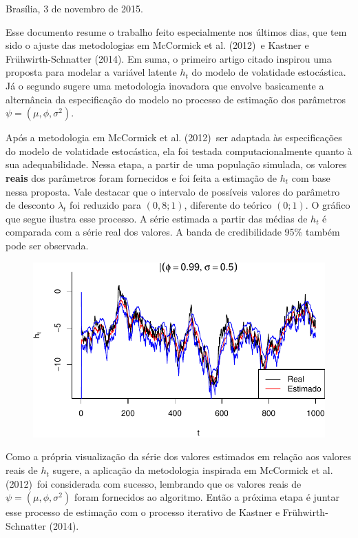\documentclass[12pt, a4paper]{article}
\begin{document}
\newcommand{\mccormick}{McCormick et al. (2012)}
\newcommand{\kastner}{Kastner e Frühwirth-Schnatter (2014)}

\noindent Brasília, 3 de novembro de 2015.
\newline

Esse documento resume o trabalho feito especialmente nos últimos dias, que tem sido o ajuste das metodologias em \mccormick\ e \kastner. Em suma, o primeiro artigo citado inspirou uma proposta para modelar a variável latente $h_t$ do modelo de volatidade estocástica. Já o segundo sugere uma metodologia inovadora que envolve basicamente a alternância da especificação do modelo no processo de estimação dos parâmetros $\psi = (\mu, \phi, \sigma^2)$.

Após a metodologia em \mccormick\ ser adaptada às especificações do modelo de volatidade estocástica, ela foi testada computacionalmente quanto à sua adequabilidade. Nessa etapa, a partir de uma população simulada, os valores \textbf{reais} dos parâmetros foram fornecidos e foi feita a estimação de $h_t$ com base nessa proposta. Vale destacar que o intervalo de possíveis valores do parâmetro de desconto $\lambda_t$ foi reduzido para $(0,8; 1)$, diferente do teórico $(0; 1)$. O gráfico que segue ilustra esse processo. A série estimada a partir das médias de $h_t$ é comparada com a série real dos valores. A banda de credibilidade 95\% também pode ser observada.

\begin{figure}[ht]
  \centering
  \includegraphics{img/p099s05_inicio}
\end{figure}

Como a própria visualização da série dos valores estimados em relação aos valores reais de $h_t$ sugere, a aplicação da metodologia inspirada em \mccormick\ foi considerada com sucesso, lembrando que os valores reais de $\psi = (\mu, \phi, \sigma^2)$ foram fornecidos ao algoritmo. Então a próxima etapa é juntar esse processo de estimação com o processo iterativo de \kastner.
\end{document}
